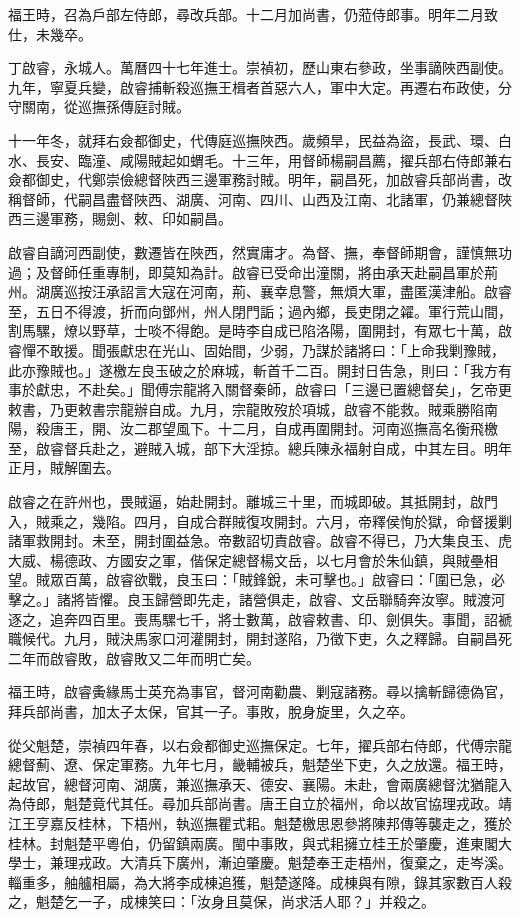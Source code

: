 \begin{pinyinscope}
福王時，召為戶部左侍郎，尋改兵部。十二月加尚書，仍蒞侍郎事。明年二月致仕，未幾卒。

丁啟睿，永城人。萬曆四十七年進士。崇禎初，歷山東右參政，坐事謫陜西副使。九年，寧夏兵變，啟睿捕斬殺巡撫王楫者首惡六人，軍中大定。再遷右布政使，分守關南，從巡撫孫傳庭討賊。

十一年冬，就拜右僉都御史，代傳庭巡撫陜西。歲頻旱，民益為盜，長武、環、白水、長安、臨潼、咸陽賊起如蝟毛。十三年，用督師楊嗣昌薦，擢兵部右侍郎兼右僉都御史，代鄭崇儉總督陜西三邊軍務討賊。明年，嗣昌死，加啟睿兵部尚書，改稱督師，代嗣昌盡督陜西、湖廣、河南、四川、山西及江南、北諸軍，仍兼總督陜西三邊軍務，賜劍、敕、印如嗣昌。

啟睿自謫河西副使，數遷皆在陜西，然實庸才。為督、撫，奉督師期會，謹慎無功過；及督師任重專制，即莫知為計。啟睿已受命出潼關，將由承天赴嗣昌軍於荊州。湖廣巡按汪承詔言大寇在河南，荊、襄幸息警，無煩大軍，盡匿漢津船。啟睿至，五日不得渡，折而向鄧州，州人閉門詬；過內鄉，長吏閉之糴。軍行荒山間，割馬騾，燎以野草，士啖不得飽。是時李自成已陷洛陽，圍開封，有眾七十萬，啟睿憚不敢援。聞張獻忠在光山、固始間，少弱，乃謀於諸將曰：「上命我剿豫賊，此亦豫賊也。」遂檄左良玉破之於麻城，斬首千二百。開封日告急，則曰：「我方有事於獻忠，不赴矣。」聞傅宗龍將入關督秦師，啟睿曰「三邊已置總督矣」，乞帝更敕書，乃更敕書宗龍辦自成。九月，宗龍敗歿於項城，啟睿不能救。賊乘勝陷南陽，殺唐王，開、汝二郡望風下。十二月，自成再圍開封。河南巡撫高名衡飛檄至，啟睿督兵赴之，避賊入城，部下大淫掠。總兵陳永福射自成，中其左目。明年正月，賊解圍去。

啟睿之在許州也，畏賊逼，始赴開封。離城三十里，而城即破。其抵開封，啟門入，賊乘之，幾陷。四月，自成合群賊復攻開封。六月，帝釋侯恂於獄，命督援剿諸軍救開封。未至，開封圍益急。帝數詔切責啟睿。啟睿不得已，乃大集良玉、虎大威、楊德政、方國安之軍，偕保定總督楊文岳，以七月會於朱仙鎮，與賊壘相望。賊眾百萬，啟睿欲戰，良玉曰：「賊鋒銳，未可擊也。」啟睿曰：「圍已急，必擊之。」諸將皆懼。良玉歸營即先走，諸營俱走，啟睿、文岳聯騎奔汝寧。賊渡河逐之，追奔四百里。喪馬騾七千，將士數萬，啟睿敕書、印、劍俱失。事聞，詔褫職候代。九月，賊決馬家口河灌開封，開封遂陷，乃徵下吏，久之釋歸。自嗣昌死二年而啟睿敗，啟睿敗又二年而明亡矣。

福王時，啟睿夤緣馬士英充為事官，督河南勸農、剿寇諸務。尋以擒斬歸德偽官，拜兵部尚書，加太子太保，官其一子。事敗，脫身旋里，久之卒。

從父魁楚，崇禎四年春，以右僉都御史巡撫保定。七年，擢兵部右侍郎，代傅宗龍總督薊、遼、保定軍務。九年七月，畿輔被兵，魁楚坐下吏，久之放還。福王時，起故官，總督河南、湖廣，兼巡撫承天、德安、襄陽。未赴，會兩廣總督沈猶龍入為侍郎，魁楚竟代其任。尋加兵部尚書。唐王自立於福州，命以故官協理戎政。靖江王亨嘉反桂林，下梧州，執巡撫瞿式耜。魁楚檄思恩參將陳邦傳等襲走之，獲於桂林。封魁楚平粵伯，仍留鎮兩廣。閩中事敗，與式耜擁立桂王於肇慶，進東閣大學士，兼理戎政。大清兵下廣州，漸迫肇慶。魁楚奉王走梧州，復棄之，走岑溪。輜重多，舳艫相屬，為大將李成棟追獲，魁楚遂降。成棟與有隙，錄其家數百人殺之，魁楚乞一子，成棟笑曰：「汝身且莫保，尚求活人耶？」并殺之。


\end{pinyinscope}
